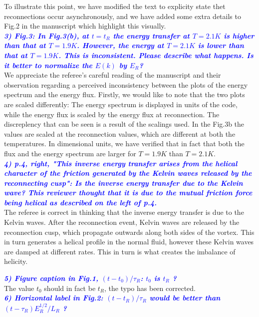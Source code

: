 \documentclass[a4paper,10pt]{article}
\def\blue#1{\textcolor{blue}{#1}}
\def\refcomment#1{\textbf{\blue{\emph{#1}}}\\}
\begin{document}
    To illustrate this point, we have modified the text to explicity state thet reconnections occur asynchronously, and we have added some extra details to Fig.2 in the manuscript which highlight this visually. \\

    \refcomment{3) Fig.3: In Fig.3(b), at $t = t_R$ the energy transfer at $T = 2.1K$ is
    higher than that at $T = 1.9K$. However, the energy at $T = 2.1K$ is lower
    than that at $T = 1.9K$. This is inconsistent. Please describe what
    happens. Is it better to normalize the $E(k)$ by $E_R$?}

    We appreciate the referee’s careful reading of the manuscript and their observation regarding a perceived inconsistency between the plots of the energy spectrum and the energy flux. Firstly, we would like to note that the two plots are scaled differently: The energy spectrum is displayed in units of the code, while the energy flux is scaled by the energy flux at reconnection. The discreplency that can be seen is a result of the scalings used. In the Fig.3b the values are scaled at the reconnection values, which are different at both the temperatures. In dimensional units, we have verified that in fact that both the flux and the energy spectrum are larger for $T=1.9K$ than $T=2.1K$. \\

    \refcomment{4) p.4, right, "This inverse energy transfer arises from the helical
    character of the friction generated by the Kelvin waves released by
    the reconnecting cusp": Is the inverse energy transfer due to the
    Kelvin wave? This reviewer thought that it is due to the mutual
    friction force being helical as described on the left of p.4.}

    The referee is correct in thinking that the inverse energy transfer is due to the Kelvin waves. After the reconnection event, Kelvin waves are released by the reconnection cusp, which propagate outwards along both sides of the vortex. This in turn generates a helical profile in the normal fluid, however these Kelvin waves are damped at different rates. This in turn is what creates the imbalance of helicity.  
  
    \refcomment{5) Figure caption in Fig.1, $(t - t_0)/\tau_R$: $t_0$ is $t_R$ ?}

    The value $t_0$ should in fact be $t_R$, the typo has been corrected.\\
    
    \refcomment{6) Horizontal label in Fig.2: $(t - t_R)/\tau_R$ would be better than $(t- \tau_R)E_R^{1/2}/L_R$ ?}
\end{document}
